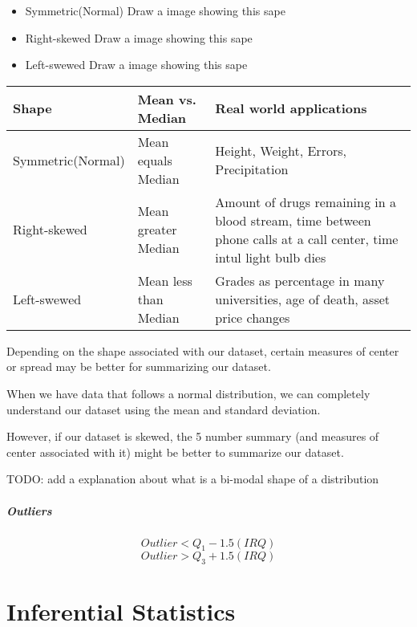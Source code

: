 \documentclass[]{article}
\begin{document}
\begin{itemize}
	\item Symmetric(Normal) 
	Draw a image showing this sape
	\item Right-skewed 
	Draw a image showing this sape
	\item Left-swewed 
	Draw a image showing this sape
\end{itemize}


\begin{center}
	\begin{tabular}{| l | l | l |}
		\hline
		Shape & Mean vs. Median & Real world applications \\ \hline
		Symmetric(Normal) & Mean equals Median & Height, Weight, Errors, Precipitation \\ \hline
		Right-skewed & Mean greater Median & Amount of drugs remaining in a blood stream, time between phone calls at a call center, time intul light bulb dies \\ \hline
		Left-swewed & Mean less than Median & Grades as percentage in many universities, age of death, asset price changes \\ \hline
	\end{tabular}
\end{center}

Depending on the shape associated with our dataset, certain measures of center or spread may be better for summarizing our dataset.

When we have data that follows a normal distribution, we can completely understand our dataset using the mean and standard deviation.

However, if our dataset is skewed, the 5 number summary (and measures of center associated with it) might be better to summarize our dataset. 

TODO: add a explanation about what is a bi-modal shape of a distribution

\subsubsection{Outliers}
\[ Outlier < Q_{1} - 1.5(IRQ) \]
\[ Outlier > Q_{3} + 1.5(IRQ) \]
 

\part{Inferential Statistics}
\end{document}
